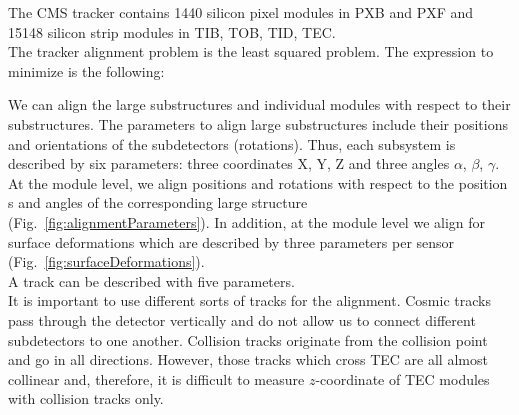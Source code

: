 The CMS tracker contains 1440 silicon pixel modules in PXB and PXF and 15148 silicon strip modules in TIB, TOB, TID, TEC.\\

The tracker alignment problem is the least squared problem. The expression to minimize is the following:\\

\begin{equation}
\end{equation}


We can align the large substructures and individual modules with respect to their substructures. The parameters to align large substructures include their positions and orientations of the subdetectors (rotations). Thus, each subsystem is described by six parameters: three coordinates X, Y, Z and three angles $\alpha$, $\beta$, $\gamma$. At the module level, we align positions and rotations with respect to the position s and angles of the corresponding large structure (Fig.~\ref{fig:alignmentParameters}). In addition, at the module level we align for surface deformations which are described by three parameters per sensor (Fig.~\ref{fig:surfaceDeformations}). \\

A track can be described with five parameters.\\


It is important to use different sorts of tracks for the alignment. Cosmic tracks pass through the detector vertically and do not allow us to connect different subdetectors to one another. Collision tracks originate from the collision point and go in all directions. However, those tracks which cross TEC are all almost collinear and, therefore, it is difficult to measure $z$-coordinate of TEC modules with collision tracks only.\\

